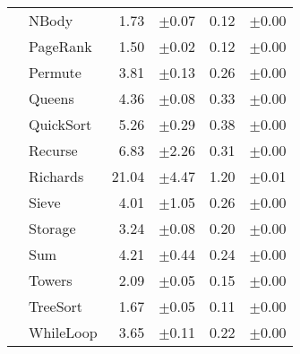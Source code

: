 \begin{tabular}{ll@{\hspace{6pt}}r@{\hspace{3pt}}l@{\hspace{6pt}}r@{\hspace{3pt}}l}
 & NBody & 1.73 & \scriptsize\textcolor{gray!60}{$\pm$0.07} & 0.12 & \scriptsize\textcolor{gray!60}{$\pm$0.00} \\
 & PageRank & 1.50 & \scriptsize\textcolor{gray!60}{$\pm$0.02} & 0.12 & \scriptsize\textcolor{gray!60}{$\pm$0.00} \\
 & Permute & 3.81 & \scriptsize\textcolor{gray!60}{$\pm$0.13} & 0.26 & \scriptsize\textcolor{gray!60}{$\pm$0.00} \\
 & Queens & 4.36 & \scriptsize\textcolor{gray!60}{$\pm$0.08} & 0.33 & \scriptsize\textcolor{gray!60}{$\pm$0.00} \\
 & QuickSort & 5.26 & \scriptsize\textcolor{gray!60}{$\pm$0.29} & 0.38 & \scriptsize\textcolor{gray!60}{$\pm$0.00} \\
 & Recurse & 6.83 & \scriptsize\textcolor{gray!60}{$\pm$2.26} & 0.31 & \scriptsize\textcolor{gray!60}{$\pm$0.00} \\
 & Richards & 21.04 & \scriptsize\textcolor{gray!60}{$\pm$4.47} & 1.20 & \scriptsize\textcolor{gray!60}{$\pm$0.01} \\
 & Sieve & 4.01 & \scriptsize\textcolor{gray!60}{$\pm$1.05} & 0.26 & \scriptsize\textcolor{gray!60}{$\pm$0.00} \\
 & Storage & 3.24 & \scriptsize\textcolor{gray!60}{$\pm$0.08} & 0.20 & \scriptsize\textcolor{gray!60}{$\pm$0.00} \\
 & Sum & 4.21 & \scriptsize\textcolor{gray!60}{$\pm$0.44} & 0.24 & \scriptsize\textcolor{gray!60}{$\pm$0.00} \\
 & Towers & 2.09 & \scriptsize\textcolor{gray!60}{$\pm$0.05} & 0.15 & \scriptsize\textcolor{gray!60}{$\pm$0.00} \\
 & TreeSort & 1.67 & \scriptsize\textcolor{gray!60}{$\pm$0.05} & 0.11 & \scriptsize\textcolor{gray!60}{$\pm$0.00} \\
 & WhileLoop & 3.65 & \scriptsize\textcolor{gray!60}{$\pm$0.11} & 0.22 & \scriptsize\textcolor{gray!60}{$\pm$0.00} \\
\bottomrule
\end{tabular}